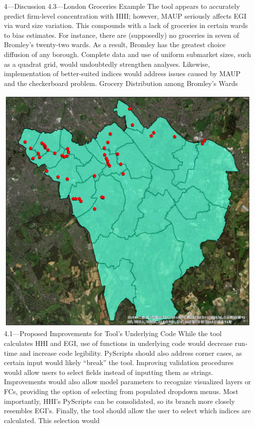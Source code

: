 \documentclass[]{article}
\begin{document}
4---Discussion 4.3---London Groceries Example The tool appears to
accurately predict firm-level concentration with HHI; however, MAUP
seriously affects EGI via ward size variation. This compounds with a
lack of groceries in certain wards to bias estimates. For instance,
there are (supposedly) no groceries in seven of Bromley's twenty-two
wards. As a result, Bromley has the greatest choice diffusion of any
borough. Complete data and use of uniform submarket sizes, such as a
quadrat grid, would undoubtedly strengthen analyses. Likewise,
implementation of better-suited indices would address issues caused by
MAUP and the checkerboard problem. Grocery Distribution among Bromley's
Wards

\includegraphics[width=17.07in]{15} 4.1---Proposed Improvements for
Tool's Underlying Code While the tool calculates HHI and EGI, use of
functions in underlying code would decrease run-time and increase code
legibility. PyScripts should also address corner cases, as certain input
would likely ``break'' the tool. Improving validation procedures would
allow users to select fields instead of inputting them as strings.
Improvements would also allow model parameters to recognize visualized
layers or FCs, providing the option of selecting from populated dropdown
menus. Most importantly, HHI's PyScripts can be consolidated, so its
branch more closely resembles EGI's. Finally, the tool should allow the
user to select which indices are calculated. This selection would
\end{document}
